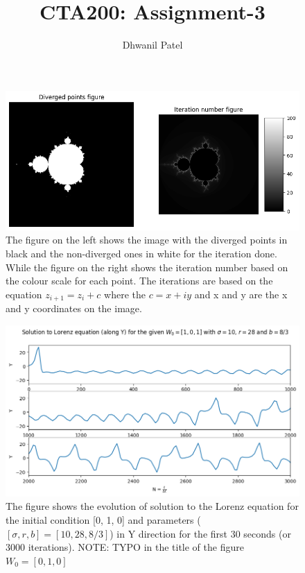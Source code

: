 \documentclass[12pt]{article}
\title{CTA200: Assignment-3}
\author{Dhwanil Patel}
\begin{document}
\maketitle
\begin{figure}[hbt!]
    \centering
    \includegraphics[width=\textwidth]{Plots/Q_1.png}
    \caption{The figure on the left shows the image with the diverged points in black and the non-diverged ones in white for the iteration done. While the figure on the right shows the iteration number based on the colour scale for each point. The iterations are based on the equation $z_{i+1} = z_i + c$ where the $c = x + iy$ and x and y are the x and y coordinates on the image.}
    \label{fig: Q1}
\end{figure}

\begin{figure}[hbt!]
    \centering
    \includegraphics[width=\textwidth]{Plots/Q2_3.png}
    \caption{The figure shows the evolution of solution to the Lorenz equation for the initial condition [0, 1, 0] and parameters ($[\sigma, r, b] = [10, 28, 8/3]$) in Y direction for the first 30 seconds (or 3000 iterations). NOTE: TYPO in the title of the figure $W_0 = [0, 1, 0]$}
    \label{fig: Q2_3}
\end{figure}
\end{document}
